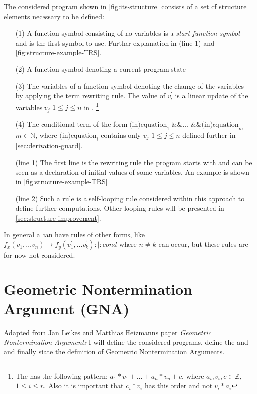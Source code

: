 The considered program shown in \autoref{fig:its-structure} consists of a set of structure elements necessary to be defined:
\begin{enumerate}[leftmargin=1]
	\item[(1)] A function symbol consisting of no variables is a \textit{start function symbol} and is the first symbol to use. Further explanation in (line 1) and \autoref{fig:structure-example-TRS}.
	\item[(2)] A function symbol denoting a current program-state
	\item[(3)] The variables of a function symbol denoting the change of the variables by applying the term rewriting rule. The value of $v^\prime_i$ is a linear update of the variables $v_j$ $1 \le j \le n$ in \stdLinInt. \footnote{The \stdLinInt has the following pattern: $ a_1*v_1 + \dots + a_n*v_n + c$, where $a_i , v_i, c \in \mathbb{Z}$, $1 \le i\le n$. 
		Also it is important that $a_i * v_i$ has this order and not $v_i*a_i$} 
	\item[(4)] The conditional term of the form $\text{(in)equation}_1 \text{ \&\& } \dots \text{ \&\& } \text{(in)equation}_m$ $m \in \mathbb{N}$, where $\text{(in)equation}_i$ contains only $v_j$ $1 \le j \le n$ defined further in \autoref{sec:derivation-guard}.
	\item[(line 1)] The first line is the rewriting rule the program starts with and can be seen as a declaration of initial values of some variables. An example is shown in \autoref{fig:structure-example-TRS}
	\item[(line 2)] Such a rule is a self-looping rule considered within this approach to define further computations. Other looping rules will be presented in \autoref{sec:structure-improvement}.
\end{enumerate} 

In general a \its can have rules of other forms, like $f_x(v_1, \dots v_n) \rightarrow f_y(v^\prime_1, \dots v^\prime_k) :|: cond$ where $n \ne k$ can occur, but these rules are for now not considered.

\section{Geometric Nontermination Argument (GNA)}
Adapted from Jan Leikes and Matthias Heizmanns paper \textit{Geometric Nontermination Arguments} \cite{leike2014geometric} I will define the considered programs, define the \stem and \loopt and finally state the definition of Geometric Nontermination Arguments.

